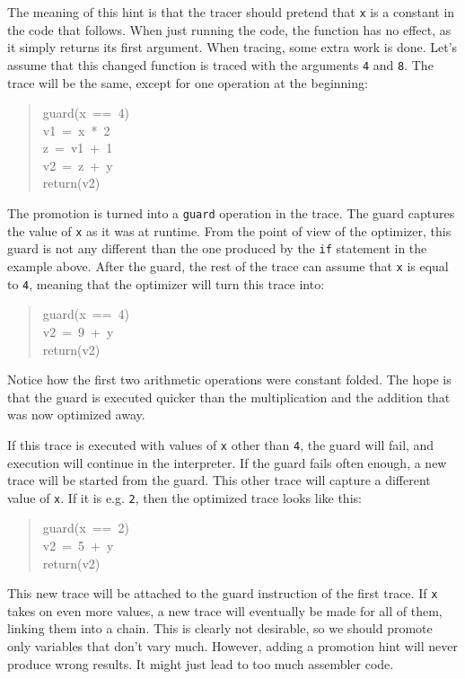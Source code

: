 \documentclass{sig-alternate}
\begin{document}
The meaning of this hint is that the tracer should pretend that \texttt{x} is a
constant
in the code that follows. When just running the code, the function has no
effect, as it simply returns its first argument. When tracing, some extra work
is done. Let's assume that this changed function is traced with
the arguments \texttt{4} and \texttt{8}. The trace will be the same, except for one
operation at the beginning:
%
\begin{quote}{\ttfamily \raggedright \noindent
guard(x~==~4)\\
v1~=~x~*~2\\
z~=~v1~+~1\\
v2~=~z~+~y\\
return(v2)
}
\end{quote}

The promotion is turned into a \texttt{guard} operation in the trace. The guard
captures the value of \texttt{x} as it was at runtime. From the point of view of the
optimizer, this guard is not any different than the one produced by the \texttt{if}
statement in the example above. After the guard, the rest of the trace can
assume that \texttt{x} is equal to \texttt{4}, meaning that the optimizer will turn this
trace into:
%
\begin{quote}{\ttfamily \raggedright \noindent
guard(x~==~4)\\
v2~=~9~+~y\\
return(v2)
}
\end{quote}

Notice how the first two arithmetic operations were constant folded. The hope is
that the guard is executed quicker than the multiplication and the addition that
was now optimized away.

If this trace is executed with values of \texttt{x} other than \texttt{4}, the guard will
fail, and execution will continue in the interpreter. If the guard fails often
enough, a new trace will be started from the guard. This other trace will
capture a different value of \texttt{x}. If it is e.g. \texttt{2}, then the optimized
trace looks like this:
%
\begin{quote}{\ttfamily \raggedright \noindent
guard(x~==~2)\\
v2~=~5~+~y\\
return(v2)
}
\end{quote}

This new trace will be attached to the guard instruction of the first trace. If
\texttt{x} takes on even more values, a new trace will eventually be made for all of them,
linking them into a chain. This is clearly not desirable, so we should promote
only variables that don't vary much. However, adding a promotion hint will never produce wrong
results. It might just lead to too much assembler code.
\end{document}
